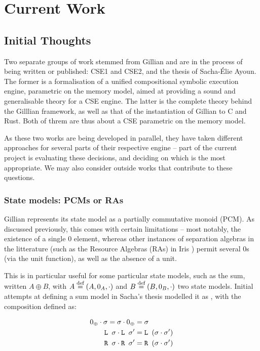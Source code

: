 \chapter{Current Work}

\section{Initial Thoughts}

Two separate groups of work stemmed from Gillian \cite{gillian0, gillian1, gillian2} and are in the process of being written or published: CSE1 \cite{cse1} and CSE2, and the thesis of Sacha-Élie Ayoun. The former is a formalisation of a unified compositional symbolic execution engine, parametric on the memory model, aimed at providing a sound and generalisable theory for a CSE engine. The latter is the complete theory behind the Gilllian framework, as well as that of the instantiation of Gillian to C and Rust. Both of threm are thus about a CSE parametric on the memory model.

As these two works are being developed in parallel, they have taken different approaches for several parts of their respective engine -- part of the current project is evaluating these decisions, and deciding on which is the most appropriate. We may also consider outside works that contribute to these questions.

\subsection{State models: PCMs or RAs}

Gillian represents its state model as a partially commutative monoid (PCM). As discussed previously, this comes with certain limitations -- most notably, the existence of a single $0$ element, whereas other instances of separation algebras in the litterature (such as the Resource Algebras (RAs) in Iris \cite{iris}) permit several $0$s (via the unit function), as well as the absence of a unit.

This is in particular useful for some particular state models, such as the sum, written $A \oplus B$, with $A\stackrel{\textnormal{def}}=(A,0_A,\cdot)$ and $B\stackrel{\textnormal{def}}=(B,0_B,\cdot)$ two state models. Initial attempts at defining a sum model in Sacha's thesis modelled it as , with the composition defined as:

{
\newcommand{\LS}[0]{\code{L }}
\newcommand{\RS}[0]{\code{R }}
\begin{align*}
	0_\oplus \cdot \st = \st \cdot 0_\oplus &= \st \\*
	\LS\st \cdot \LS\st' &= \LS (\st\cdot\st') \\*
	\RS\st \cdot \RS\st' &= \RS (\st\cdot\st')
\end{align*}
}


